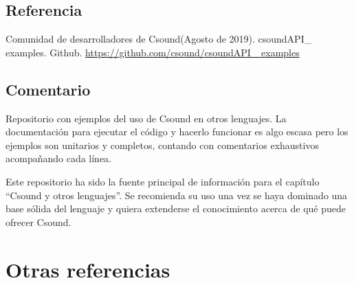 \subsection{Referencia}

Comunidad de desarrolladores de Csound(Agosto de 2019). csoundAPI\_ examples. Github. \url{https://github.com/csound/csoundAPI\_ examples}

\subsection{Comentario}

Repositorio con ejemplos del uso de Csound en otros lenguajes. La documentación para ejecutar el código y hacerlo funcionar es algo escasa pero los ejemplos son unitarios y completos, contando con comentarios exhaustivos acompañando cada línea.

Este repositorio ha sido la fuente principal de información para el capítulo ``Csound y otros lenguajes''. Se recomienda su uso una vez se haya dominado una base sólida del lenguaje y quiera extenderse el conocimiento acerca de qué puede ofrecer Csound.
\pagebreak

\section{Otras referencias}

